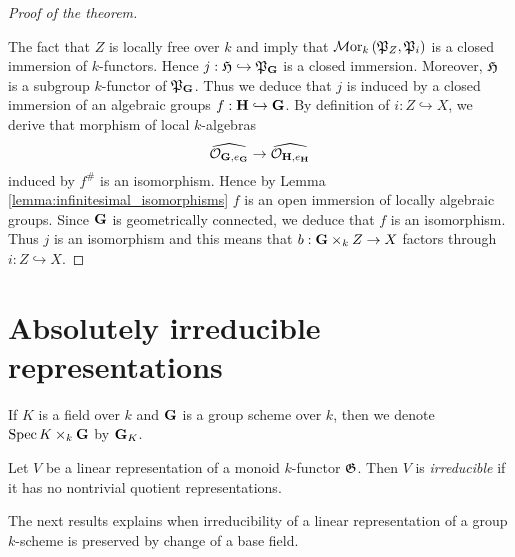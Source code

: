 \begin{proof}[Proof of the theorem]
\begin{center}
\end{center}
The fact that $Z$ is locally free over $k$ and {\cite[Theorem 7.2]{kfunctors}} imply that $\mathcal{M}\mathrm{or}_k\left({\mathfrak P}_{Z},{\mathfrak P}_{i}\right)$ is a closed immersion of $k$-functors. Hence $j:{\mathfrak H} \hookrightarrow {\mathfrak P}_{\mathbf{G}}$ is a closed immersion. Moreover, ${\mathfrak H}$ is a subgroup $k$-functor of ${\mathfrak P}_{\mathbf{G}}$. Thus we deduce that $j$ is induced by a closed immersion of an algebraic groups $f:\mathbf{H} \hookrightarrow \mathbf{G}$. By definition of $i:Z\hookrightarrow X$, we derive that morphism of local $k$-algebras
$$\widehat{{\mathcal O}_{\mathbf{G},e_{\mathbf{G}}}} \rightarrow  \widehat{{\mathcal O}_{\mathbf{H},e_{\mathbf{H}}}}$$
induced by $f^{\#}$ is an isomorphism. Hence by Lemma \ref{lemma:infinitesimal_isomorphisms} $f$ is an open immersion of locally algebraic groups. Since $\mathbf{G}$ is geometrically connected, we deduce that $f$ is an isomorphism. Thus $j$ is an isomorphism and this means that $b:\mathbf{G}\times_k Z\rightarrow X$ factors through $i:Z\hookrightarrow X$.
\end{proof}

\section{Absolutely irreducible representations}
\noindent
If $K$ is a field over $k$ and $\mathbf{G}$ is a group scheme over $k$, then we denote $\mathrm{Spec}\, K\times_k \mathbf{G}$ by $\mathbf{G}_K$.

\begin{definition}
Let $V$ be a linear representation of a monoid $k$-functor ${\mathfrak G}$. Then $V$ is \textit{irreducible} if it has no nontrivial quotient representations.
\end{definition}
\noindent
The next results explains when irreducibility of a linear representation of a group $k$-scheme is preserved by change of a base field.


